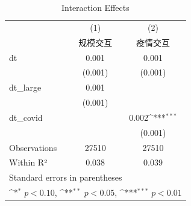 \begin{table}[htbp]\centering
\def\sym#1{\ifmmode^{#1}\else\(^{#1}\)\fi}
\caption{Interaction Effects}
\begin{tabular}{l*{2}{c}}
\hline\hline
            &\multicolumn{1}{c}{(1)}&\multicolumn{1}{c}{(2)}\\
            &\multicolumn{1}{c}{规模交互}&\multicolumn{1}{c}{疫情交互}\\
\hline
dt          &       0.001         &       0.001         \\
            &     (0.001)         &     (0.001)         \\
[1em]
dt\_large    &       0.001         &                     \\
            &     (0.001)         &                     \\
[1em]
dt\_covid    &                     &       0.002\sym{***}\\
            &                     &     (0.001)         \\
\hline
Observations&       27510         &       27510         \\
Within R²   &       0.038         &       0.039         \\
\hline\hline
\multicolumn{3}{l}{\footnotesize Standard errors in parentheses}\\
\multicolumn{3}{l}{\footnotesize \sym{*} \(p<0.10\), \sym{**} \(p<0.05\), \sym{***} \(p<0.01\)}\\
\end{tabular}
\end{table}
